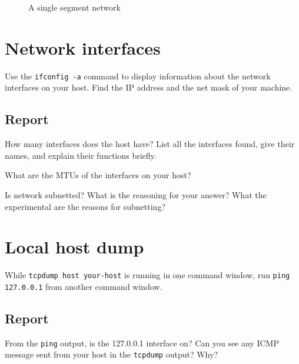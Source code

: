 \documentclass{../UTNetLab}
\begin{document}
\begin{center}
\begin{minipage}{0.48\textwidth}
\begin{flushright}
\begin{figure}[H]
                    \caption{A single segment network}        
                \end{figure}
            \end{flushright}
        \end{minipage}
    \end{center}

\section{Network interfaces}
    Use the \lstinline{ifconfig -a} command to display information about the network interfaces on your host.
    Find the IP address and the net mask of your machine.
    \subsection*{Report}

    How many interfaces does the host have?
    List all the interfaces found, give their names, and explain their functions briefly.

    What are the MTUs of the interfaces on your host?

    Is network subnetted?
    What is the reasoning for your answer? What the experimental are the reasons for subnetting?


\section{Local host dump}
    While \lstinline[emph={your-host}]{tcpdump host your-host} is running in one command window, run \lstinline{ping 127.0.0.1} from another command window.
    
    \subsection*{Report}
    From the \lstinline{ping} output, is the 127.0.0.1 interface on?
    Can you see any ICMP message sent from your host in the \lstinline{tcpdump} output?
    Why?
\end{document}
